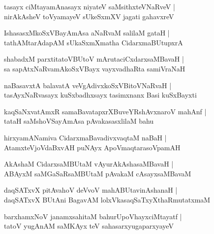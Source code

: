 \begin{shloka}
tasayx ciMtayamAnasayx niyateV saMsithxteVNaRveV |\\
nirAkAsheV toVyamayeV sUkeSxmXV jagati gahavxreV 
\end{shloka}

\begin{shloka}
IshasasxMkoSxVBayAmAsa aNaRvaM salilaM gataH |\\
tathAMtarAdapAM sUkaSxmXmatha CidarxmaBUtupxrA 
\end{shloka}

\begin{shloka}
shabadxM parxtitatoVBUtoV mArutaciCxdarxsaMBavaH |\\
sa sapAtxNaRvamAkoSxVBayx vayxvadhaRta samiVraNaH 
\end{shloka}

\begin{shloka}
naBasavxtA balavatA veVgAdivxkoSxVBitoVNaRvaH |\\
tasAyxNaRvasayx kuSxbadhxsayx tasimxnanx Basi kuSxBayxti 
\end{shloka}

\begin{shloka}
kaqSaNxvatAmxR samaBavatapxrXBuveYRshAvxnaroV mahAnf |\\
tataH saMshoVSayAmAsa pAvakasasxlilaM bahu
\end{shloka}

\begin{shloka}
hirxyamANamiva CidarxmaBavadivxvaqtaM naBaH |\\
AtamxteVjoVdaBxvAH puNAyx ApoVmaqtarasoVpamAH
\end{shloka}

\begin{shloka}
AkAshaM CidarxsaMBUtaM vAyurAkAshasaMBavaH |\\
ABAyxM saMGaSaRsaMBUtaM pAvakaM cAsayxsaMBavaM
\end{shloka}

\begin{shloka}
daqSATxvX pitAvahoV deVvoV mahABUtavinAshanaH |\\
daqSATxvX BUtAni BagavAM lolxVkasaqSaTxyXthaRmutatxmaM 
\end{shloka}

\begin{shloka}
barxhamxNoV janamxsahitaM bahurUpoVhayxciMtayatf |\\
tatoV yugAnAM saMKAyx teV sahasarxyugaparxyayeV 
\end{shloka}

